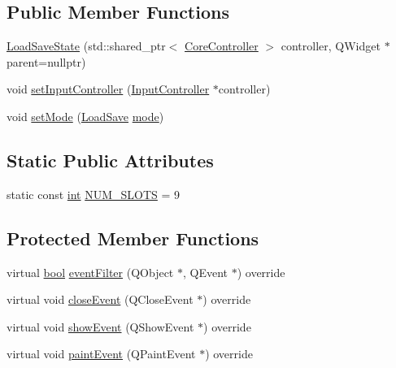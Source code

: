 \subsection*{Public Member Functions}
\begin{DoxyCompactItemize}
\item 
\mbox{\hyperlink{class_q_g_b_a_1_1_load_save_state_a9f873de40c6b36e14eda11ed9ae92581}{Load\+Save\+State}} (std\+::shared\+\_\+ptr$<$ \mbox{\hyperlink{class_q_g_b_a_1_1_core_controller}{Core\+Controller}} $>$ controller, Q\+Widget $\ast$parent=nullptr)
\item 
void \mbox{\hyperlink{class_q_g_b_a_1_1_load_save_state_afa638517267f40fdc7d3ca2a00041d6a}{set\+Input\+Controller}} (\mbox{\hyperlink{class_q_g_b_a_1_1_input_controller}{Input\+Controller}} $\ast$controller)
\item 
void \mbox{\hyperlink{class_q_g_b_a_1_1_load_save_state_a504e8f6dce3942ee8b10b7d6a19c29b1}{set\+Mode}} (\mbox{\hyperlink{namespace_q_g_b_a_a7943e4735d6f412e1479e456e6f4aca2}{Load\+Save}} \mbox{\hyperlink{ioapi_8h_a7e43d41c2fe013a373b540cba02505cf}{mode}})
\end{DoxyCompactItemize}
\subsection*{Static Public Attributes}
\begin{DoxyCompactItemize}
\item 
static const \mbox{\hyperlink{ioapi_8h_a787fa3cf048117ba7123753c1e74fcd6}{int}} \mbox{\hyperlink{class_q_g_b_a_1_1_load_save_state_ad3b947d6fb6bbacbc567fe04ffe85e71}{N\+U\+M\+\_\+\+S\+L\+O\+TS}} = 9
\end{DoxyCompactItemize}
\subsection*{Protected Member Functions}
\begin{DoxyCompactItemize}
\item 
virtual \mbox{\hyperlink{libretro_8h_a4a26dcae73fb7e1528214a068aca317e}{bool}} \mbox{\hyperlink{class_q_g_b_a_1_1_load_save_state_ad80e912f91cfa7693004fb0d2d5ea409}{event\+Filter}} (Q\+Object $\ast$, Q\+Event $\ast$) override
\item 
virtual void \mbox{\hyperlink{class_q_g_b_a_1_1_load_save_state_a93708b5072f80412acfa87f61e06518c}{close\+Event}} (Q\+Close\+Event $\ast$) override
\item 
virtual void \mbox{\hyperlink{class_q_g_b_a_1_1_load_save_state_aac9d88495406b6d991dfccd7cd7f2f21}{show\+Event}} (Q\+Show\+Event $\ast$) override
\item 
virtual void \mbox{\hyperlink{class_q_g_b_a_1_1_load_save_state_afabd75e99d746a814ab373cf4dd1e42f}{paint\+Event}} (Q\+Paint\+Event $\ast$) override
\end{DoxyCompactItemize}
